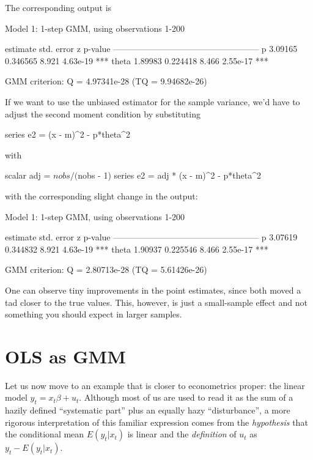 The corresponding output is
\begin{code}
Model 1: 1-step GMM, using observations 1-200

             estimate   std. error     z     p-value 
  ---------------------------------------------------
  p          3.09165     0.346565    8.921   4.63e-19 ***
  theta      1.89983     0.224418    8.466   2.55e-17 ***

  GMM criterion: Q = 4.97341e-28 (TQ = 9.94682e-26)
\end{code}


If we want to use the unbiased estimator for the sample variance, we'd
have to adjust the second moment condition by substituting
\begin{code}
series e2 = (x - m)^2 - p*theta^2
\end{code}
with
\begin{code}
scalar adj = $nobs / ($nobs - 1)
series e2 = adj * (x - m)^2 - p*theta^2
\end{code}
with the corresponding slight change in the output:
\begin{code}
Model 1: 1-step GMM, using observations 1-200

             estimate   std. error     z     p-value 
  ---------------------------------------------------
  p          3.07619     0.344832    8.921   4.63e-19 ***
  theta      1.90937     0.225546    8.466   2.55e-17 ***

  GMM criterion: Q = 2.80713e-28 (TQ = 5.61426e-26)
\end{code}
One can observe tiny improvements in the point estimates, since both
moved a tad closer to the true values. This, however, is just a
small-sample effect and not something you should expect in larger
samples.

\section{OLS as GMM}
\label{sec:gmm-ols}

Let us now move to an example that is closer to econometrics proper:
the linear model $y_t = x_t \beta + u_t$.  Although most of us are
used to read it as the sum of a hazily defined ``systematic part''
plus an equally hazy ``disturbance'', a more rigorous interpretation
of this familiar expression comes from the \emph{hypothesis} that the
conditional mean $E(y_t|x_t)$ is linear and the \emph{definition} of
$u_t$ as $y_t - E(y_t|x_t)$.

